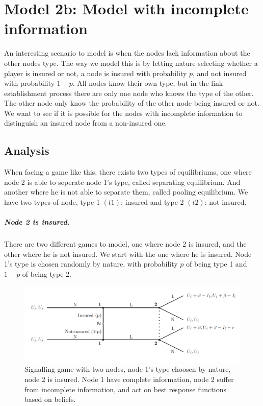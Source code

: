 \section{Model 2b: Model with incomplete information}
\label{Model with incomplete information}
An interesting scenario to model is when the nodes lack information about the other nodes type. The way we model this is by letting nature selecting whether a player is insured or not, a node is insured with probability $p$, and not insured with probability $1-p$. 
All nodes know their own type, but in the link establishment process there are only one node who knows the type of the other. The other node only know the probability of the other node being insured or not. 
We want to see if it is possible for the nodes with incomplete information to distinguish an insured node from a non-insured one. 
\subsection{Analysis}
When facing a game like this, there exists two types of equilibriums, one where node 2 is able to seperate node 1's type, called separating equilibrium. And another where he is not able to separate them, called pooling equilibrium. 
We have two types of node, type 1 $(t1)$: insured and type 2 $(t2)$: not insured. 
\subparagraph{Node 2 is insured.}
There are two different games to model, one where node 2 is insured, and the other where he is not insured. We start with the one where he is insured.
Node 1's type is chosen randomly by nature, with probability $p$ of being type 1 and $1-p$ of being type 2.
\begin{figure}[h]
\centering
  \centering
\includegraphics[width=1\linewidth]{../Figures/SignalingGameInsured.png}

\caption{Signalling game with two nodes, node 1's type choosen by nature, node 2 is insured. Node 1 have complete information, node 2 suffer from incomplete information, and act on best response functions based on beliefs. \label{fig:signalingInsured}}

\end{figure}

